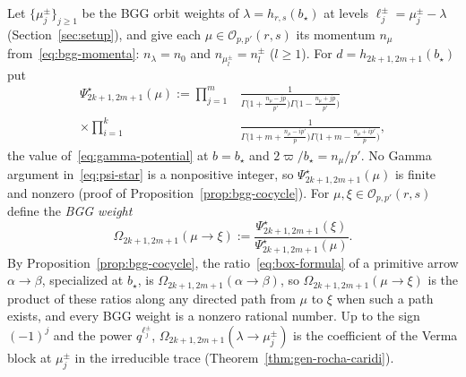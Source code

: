 \documentclass[twoside,10pt]{article}
\numberwithin{equation}{section}
\theoremstyle{slbody}
\theoremstyle{definition}
\theoremstyle{remark}
\begin{document}
Let \(\{\mu^\pm_j\}_{j\geq1}\) be the BGG orbit weights of
\(\lambda=h_{r,s}(b_\star)\) at levels \(\ell^\pm_j=\mu^\pm_j-\lambda\)
(Section~\ref{sec:setup}), and give each \(\mu\in\mathcal O_{p,p'}(r,s)\) its
momentum \(n_\mu\) from~\eqref{eq:bgg-momenta}: \(n_\lambda=n_0\) and
\(n_{\mu^\pm_l}=n^\pm_l\) (\(l\geq1\)).  For
\(d=h_{2k+1,2m+1}(b_\star)\) put
\begin{equation}\label{eq:psi-star}
 \begin{aligned}
 \Psi^\star_{2k+1,2m+1}(\mu)
 :=\prod_{j=1}^m&\frac{1}{\Gamma\bigl(1+\frac{n_\mu-jp}{p'}\bigr)
                         \Gamma\bigl(1-\frac{n_\mu+jp}{p'}\bigr)}\\
 \times\prod_{i=1}^k&\frac{1}{\Gamma\bigl(1+m+\frac{n_\mu-ip'}{p}\bigr)
                         \Gamma\bigl(1+m-\frac{n_\mu+ip'}{p}\bigr)},
 \end{aligned}
\end{equation}
the value of~\eqref{eq:gamma-potential} at \(b=b_\star\) and
\(2\varpi/b_\star=n_\mu/p'\).  No Gamma argument in~\eqref{eq:psi-star} is a
nonpositive integer, so \(\Psi^\star_{2k+1,2m+1}(\mu)\) is finite and nonzero
(proof of Proposition~\ref{prop:bgg-cocycle}).  For
\(\mu,\xi\in\mathcal O_{p,p'}(r,s)\) define the \emph{BGG weight}
\[
 \Omega_{2k+1,2m+1}(\mu\to\xi)
 :=\frac{\Psi^\star_{2k+1,2m+1}(\xi)}{\Psi^\star_{2k+1,2m+1}(\mu)}.
\]
By Proposition~\ref{prop:bgg-cocycle}, the ratio~\eqref{eq:box-formula} of a
primitive arrow \(\alpha\to\beta\), specialized at \(b_\star\), is
\(\Omega_{2k+1,2m+1}(\alpha\to\beta)\), so \(\Omega_{2k+1,2m+1}(\mu\to\xi)\) is
the product of these ratios along any directed path from \(\mu\) to \(\xi\)
when such a path exists, and every BGG weight is a nonzero rational number.  Up to the sign \((-1)^j\)
and the power \(q^{\ell^\pm_j}\), \(\Omega_{2k+1,2m+1}(\lambda\to\mu^\pm_j)\) is
the coefficient of the Verma block at \(\mu^\pm_j\) in the irreducible trace
(Theorem~\ref{thm:gen-rocha-caridi}).
\end{document}
